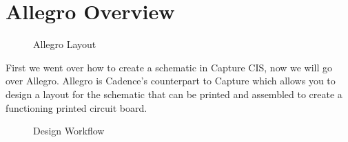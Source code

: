 \section{Allegro Overview}
\begin{figure}[H]
  \centering
\caption{Allegro Layout}
\label{img:layoutfull}
\end{figure}

First we went over how to create a schematic in Capture CIS, now we will go over Allegro. Allegro is
Cadence's counterpart to Capture which allows you to design a layout for the schematic that can be
printed and assembled to create a functioning printed circuit board.

\begin{figure}[H]
  \centering
\caption{Design Workflow}
\label{img:designworkflow}
\end{figure}

